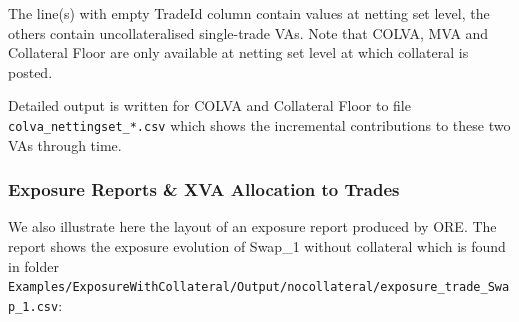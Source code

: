 The line(s) with empty TradeId column contain values at netting set level, the others contain uncollateralised
single-trade VAs.  Note that COLVA, MVA and Collateral Floor are only available at netting set level at which collateral
is posted.

\medskip
Detailed output is written for COLVA and Collateral Floor to file {\tt colva\_nettingset\_*.csv} which shows the 
incremental contributions to these two VAs through time.


\subsubsection*{Exposure Reports \& XVA Allocation to Trades}

We also illustrate here the layout of an exposure report produced by ORE. The report shows the exposure evolution of
Swap\_1 without collateral which is found in folder \\
{\tt Examples/ExposureWithCollateral/Output/nocollateral/exposure\_trade\_Swap\_1.csv}:

\begin{center}
\end{center}

